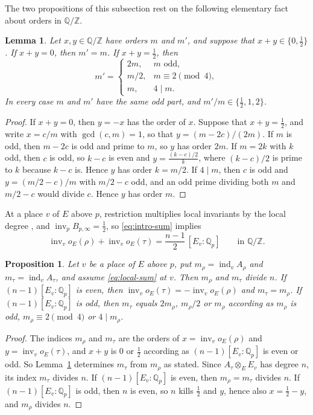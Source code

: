 \documentclass[a4paper,11pt]{amsart}
\newtheorem{proposition}[theorem]{Proposition}
\newtheorem{lemma}[theorem]{Lemma}
\theoremstyle{definition}
\theoremstyle{remark}
\numberwithin{equation}{section}
\newcommand{\Q}{\mathbb{Q}}
\newcommand{\Z}{\mathbb{Z}}
\DeclareMathOperator{\inv}{inv}
\DeclareMathOperator{\ind}{ind}
\newcommand{\Bpinf}{B_{p,\infty}}
\begin{document}
The two propositions of this subsection rest on the following elementary fact about orders in $\Q/\Z$.

\begin{lemma}\label{lem:half-shift}
Let $x,y\in\Q/\Z$ have orders $m$ and $m'$, and suppose that $x+y\in\{0,\tfrac12\}$. If $x+y=0$, then $m'=m$. If $x+y=\tfrac12$, then
\[
 m'=\begin{cases}
 2m, & m\text{ odd},\\
 m/2, & m\equiv2\pmod4,\\
 m, & 4\mid m.
 \end{cases}
\]
In every case $m$ and $m'$ have the same odd part, and $m'/m\in\{\tfrac12,1,2\}$.
\end{lemma}

\begin{proof}
If $x+y=0$, then $y=-x$ has the order of $x$. Suppose that $x+y=\frac12$, and write $x=c/m$ with $\gcd(c,m)=1$, so that $y=(m-2c)/(2m)$. If $m$ is odd, then $m-2c$ is odd and prime to $m$, so $y$ has order $2m$. If $m=2k$ with $k$ odd, then $c$ is odd, so $k-c$ is even and $y=\frac{(k-c)/2}{k}$, where $(k-c)/2$ is prime to $k$ because $k-c$ is. Hence $y$ has order $k=m/2$. If $4\mid m$, then $c$ is odd and $y=(m/2-c)/m$ with $m/2-c$ odd, and an odd prime dividing both $m$ and $m/2-c$ would divide $c$. Hence $y$ has order $m$.
\end{proof}

At a place $v$ of $E$ above $p$, restriction multiplies local invariants by the local degree \cite[III, \S2, (29)]{Mil20}, and $\inv_p\Bpinf=\frac12$, so \eqref{eq:intro-sum} implies 
\begin{equation}\label{eq:local-sum}
 \inv_v o_E(\rho)+\inv_v o_E(\tau)=\frac{n-1}{2}\,[E_v:\Q_p] \qquad\text{in }\Q/\Z.
\end{equation}

\begin{proposition}\label{prop:local-indices}
Let $v$ be a place of $E$ above $p$, put $m_\rho=\ind_v A_\rho$ and $m_\tau=\ind_v A_\tau$, and assume \eqref{eq:local-sum} at $v$. Then $m_\rho$ and $m_\tau$ divide $n$. If $(n-1)[E_v:\Q_p]$ is even, then $\inv_v o_E(\tau)=-\inv_v o_E(\rho)$ and $m_\tau=m_\rho$. If $(n-1)[E_v:\Q_p]$ is odd, then $m_\tau$ equals $2m_\rho$, $m_\rho/2$ or $m_\rho$ according as $m_\rho$ is odd, $m_\rho\equiv2\pmod4$ or $4\mid m_\rho$.
\end{proposition}

\begin{proof}
The indices $m_\rho$ and $m_\tau$ are the orders of $x=\inv_v o_E(\rho)$ and $y=\inv_v o_E(\tau)$, and $x+y$ is $0$ or $\frac12$ according as $(n-1)[E_v:\Q_p]$ is even or odd. So Lemma~\ref{lem:half-shift} determines $m_\tau$ from $m_\rho$ as stated. Since $A_\tau\otimes_E E_v$ has degree $n$, its index $m_\tau$ divides $n$. If $(n-1)[E_v:\Q_p]$ is even, then $m_\rho=m_\tau$ divides $n$. If $(n-1)[E_v:\Q_p]$ is odd, then $n$ is even, so $n$ kills $\frac12$ and $y$, hence also $x=\frac12-y$, and $m_\rho$ divides $n$.
\end{proof}
\end{document}
